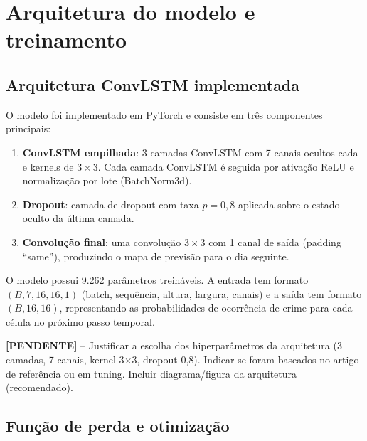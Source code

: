 \section{Arquitetura do modelo e treinamento}
\label{Sec:modelo}

\subsection{Arquitetura ConvLSTM implementada}

O modelo foi implementado em PyTorch e consiste em três componentes principais:

\begin{enumerate}
  \item \textbf{ConvLSTM empilhada}: 3 camadas ConvLSTM com 7 canais ocultos cada e kernels de $3 \times 3$. Cada camada ConvLSTM é seguida por ativação ReLU e normalização por lote (BatchNorm3d).
  \item \textbf{Dropout}: camada de dropout com taxa $p = 0{,}8$ aplicada sobre o estado oculto da última camada.
  \item \textbf{Convolução final}: uma convolução $3 \times 3$ com 1 canal de saída (padding ``same''), produzindo o mapa de previsão para o dia seguinte.
\end{enumerate}

O modelo possui 9.262 parâmetros treináveis. A entrada tem formato $(B, 7, 16, 16, 1)$ (batch, sequência, altura, largura, canais) e a saída tem formato $(B, 16, 16)$, representando as probabilidades de ocorrência de crime para cada célula no próximo passo temporal.

\textbf{[PENDENTE]} -- Justificar a escolha dos hiperparâmetros da arquitetura (3 camadas, 7 canais, kernel 3$\times$3, dropout 0,8). Indicar se foram baseados no artigo de referência ou em tuning. Incluir diagrama/figura da arquitetura (recomendado).

\subsection{Função de perda e otimização}

